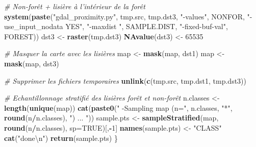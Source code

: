 \documentclass[a4paper, notitlepage, 12pt, krantz2]{krantz}
\newenvironment{Shaded}{\begin{snugshade}}{\end{snugshade}}
\newcommand{\CharTok}[1]{\textcolor[rgb]{0.31,0.60,0.02}{#1}}
\newcommand{\CommentTok}[1]{\textcolor[rgb]{0.56,0.35,0.01}{\textit{#1}}}
\newcommand{\DataTypeTok}[1]{\textcolor[rgb]{0.13,0.29,0.53}{#1}}
\newcommand{\DecValTok}[1]{\textcolor[rgb]{0.00,0.00,0.81}{#1}}
\newcommand{\KeywordTok}[1]{\textcolor[rgb]{0.13,0.29,0.53}{\textbf{#1}}}
\newcommand{\NormalTok}[1]{#1}
\newcommand{\OperatorTok}[1]{\textcolor[rgb]{0.81,0.36,0.00}{\textbf{#1}}}
\newcommand{\OtherTok}[1]{\textcolor[rgb]{0.56,0.35,0.01}{#1}}
\newcommand{\StringTok}[1]{\textcolor[rgb]{0.31,0.60,0.02}{#1}}
\begin{document}
\begin{Shaded}
\begin{Highlighting}[]
  \CommentTok{# Non-forêt + lisière à l'intérieur de la forêt}
  \KeywordTok{system}\NormalTok{(}\KeywordTok{paste}\NormalTok{(}\StringTok{"gdal_proximity.py"}\NormalTok{, tmp.src, tmp.dst3,          }
               \StringTok{"-values"}\NormalTok{, NONFOR, }
               \StringTok{"-use_input_nodata YES"}\NormalTok{,}
               \StringTok{"-maxdist "}\NormalTok{,  SAMPLE.DIST, }
               \StringTok{"-fixed-buf-val"}\NormalTok{, FOREST))}
\NormalTok{  dst3 <-}\StringTok{ }\KeywordTok{raster}\NormalTok{(tmp.dst3)}
  \KeywordTok{NAvalue}\NormalTok{(dst3) <-}\StringTok{ }\DecValTok{65535}
  
  \CommentTok{# Masquer la carte avec les lisières}
\NormalTok{  map <-}\StringTok{ }\KeywordTok{mask}\NormalTok{(map, dst1)}
\NormalTok{  map <-}\StringTok{ }\KeywordTok{mask}\NormalTok{(map, dst3)}
  
  \CommentTok{# Supprimer les fichiers temporaires}
  \KeywordTok{unlink}\NormalTok{(}\KeywordTok{c}\NormalTok{(tmp.src, tmp.dst1, tmp.dst3))                           }
  
  \CommentTok{# Echantillonnage stratifié des lisières forêt et non-forêt}
\NormalTok{  n.classes <-}\StringTok{ }\KeywordTok{length}\NormalTok{(}\KeywordTok{unique}\NormalTok{(map))}
  \KeywordTok{cat}\NormalTok{(}\KeywordTok{paste0}\NormalTok{(}\StringTok{"    -Sampling map (n="}\NormalTok{, n.classes, }\StringTok{"*"}\NormalTok{, }\KeywordTok{round}\NormalTok{(n}\OperatorTok{/}\NormalTok{n.classes), }\StringTok{") ... "}\NormalTok{))}
\NormalTok{  sample.pts <-}\StringTok{ }\KeywordTok{sampleStratified}\NormalTok{(map, }\KeywordTok{round}\NormalTok{(n}\OperatorTok{/}\NormalTok{n.classes), }\DataTypeTok{sp=}\OtherTok{TRUE}\NormalTok{)[,}\OperatorTok{-}\DecValTok{1}\NormalTok{]}
  \KeywordTok{names}\NormalTok{(sample.pts) <-}\StringTok{ "CLASS"}
  \KeywordTok{cat}\NormalTok{(}\StringTok{"done}\CharTok{\textbackslash{}n}\StringTok{"}\NormalTok{)}
  \KeywordTok{return}\NormalTok{(sample.pts)}
\NormalTok{\}}


\end{Highlighting}
\end{Shaded}
\end{document}
